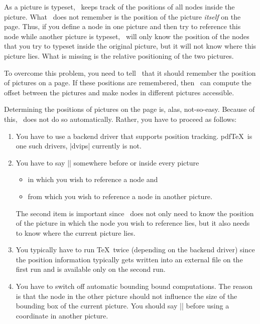 As a picture is typeset, \pgfname\ keeps track of the positions of all
nodes inside the picture. What \pgfname\ does not remember is the
position of the picture \emph{itself} on the page. Thus, if you define
a node in one picture and then try to reference this node while
another picture is typeset, \pgfname\ will only know the position of
the nodes that you try to typeset inside the original picture, but it
will not know where this picture lies. What is missing is the relative
positioning of the two pictures.

To overcome this problem, you need to tell \pgfname\ that it should
remember the position of pictures on a page. If these positions are
remembered, then \pgfname\ can compute the offset between the pictures
and make nodes in different pictures accessible.

Determining the positions of pictures on the page is, alas,
not-so-easy. Because of this, \pgfname\ does not do so
automatically. Rather, you have to proceed as follows:
\begin{enumerate}
\item You have to use a backend driver that supports position
  tracking. pdf\TeX\ is one such drivers, |dvips| currently is not.
\item You have to say |\pgfrememberpicturepositiononpagetrue|
  somewhere before or inside every picture
  \begin{itemize}
  \item in which you wish to reference a node and
  \item from which you wish to reference a node in another picture.
  \end{itemize}
  The second item is important since \pgfname\ does not only need to
  know the position of the picture in which the node you wish to
  reference lies, but it also needs to know where the current picture
  lies.
\item You typically have to run \TeX\ twice (depending on the backend
  driver) since the position information typically gets written into
  an external file on the first run and is available only on the
  second run.
\item You have to switch off automatic bounding bound
  computations. The reason is that the node in the other picture
  should not influence the size of the bounding box of the current
  picture. You should say || before
  using a coordinate in another picture.
\end{enumerate}




